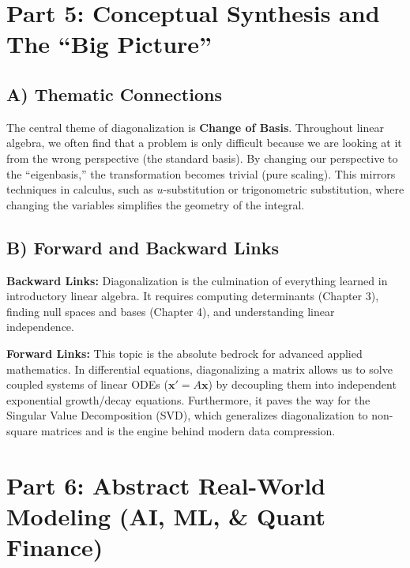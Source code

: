 \documentclass[11pt, a4paper]{article}
\theoremstyle{definition}
\theoremstyle{remark}
\begin{document}
\newpage
\section{Part 5: Conceptual Synthesis and The ``Big Picture''}

\subsection{A) Thematic Connections}
The central theme of diagonalization is \textbf{Change of Basis}. Throughout linear algebra, we often find that a problem is only difficult because we are looking at it from the wrong perspective (the standard basis). By changing our perspective to the ``eigenbasis,'' the transformation becomes trivial (pure scaling). This mirrors techniques in calculus, such as $u$-substitution or trigonometric substitution, where changing the variables simplifies the geometry of the integral.

\subsection{B) Forward and Backward Links}
\textbf{Backward Links:} Diagonalization is the culmination of everything learned in introductory linear algebra. It requires computing determinants (Chapter 3), finding null spaces and bases (Chapter 4), and understanding linear independence. 

\textbf{Forward Links:} This topic is the absolute bedrock for advanced applied mathematics. In differential equations, diagonalizing a matrix allows us to solve coupled systems of linear ODEs ($\mathbf{x}' = A\mathbf{x}$) by decoupling them into independent exponential growth/decay equations. Furthermore, it paves the way for the Singular Value Decomposition (SVD), which generalizes diagonalization to non-square matrices and is the engine behind modern data compression.

\section{Part 6: Abstract Real-World Modeling (AI, ML, \& Quant Finance)}
\end{document}
